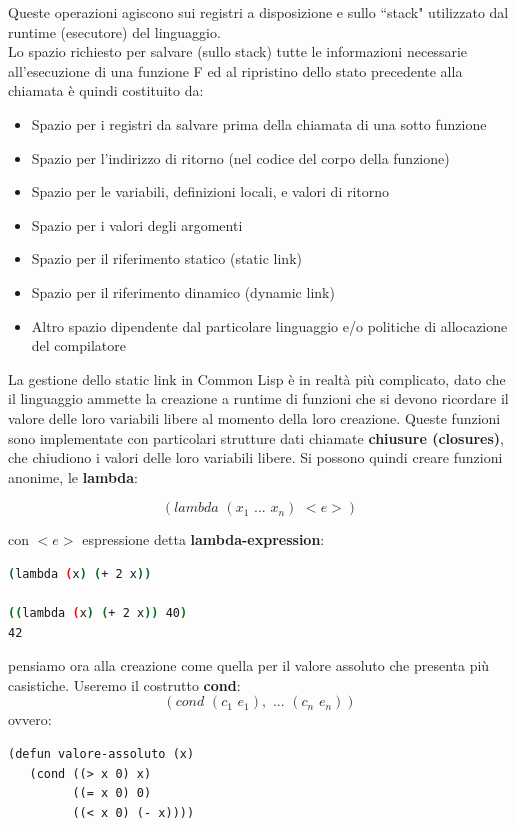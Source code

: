 \documentclass[a4paper,12pt, oneside]{book}
\begin{document}
Queste operazioni agiscono sui registri a disposizione e sullo “stack" utilizzato dal runtime (esecutore) del linguaggio.\\Lo spazio richiesto per salvare (sullo stack) tutte le informazioni necessarie all’esecuzione di
una funzione F ed al ripristino dello stato precedente alla chiamata è quindi costituito da:
\begin{itemize}
\item Spazio per i registri da salvare prima della chiamata di una sotto funzione
\item Spazio per l’indirizzo di ritorno (nel codice del corpo della funzione)
\item Spazio per le variabili, definizioni locali, e valori di ritorno
\item Spazio per i valori degli argomenti
\item Spazio per il riferimento statico (static link)
\item Spazio per il riferimento dinamico (dynamic link)
\item Altro spazio dipendente dal particolare linguaggio e/o politiche di allocazione del compilatore
\end{itemize}
La gestione dello static link in Common Lisp è in realtà più complicato,
dato che il linguaggio ammette la creazione a runtime di funzioni che si
devono ricordare il valore delle loro variabili libere al momento della
loro creazione. Queste funzioni sono implementate con particolari strutture dati chiamate \textbf{chiusure (closures)}, che chiudiono i valori delle loro variabili libere. Si possono quindi creare funzioni anonime, le \textbf{lambda}:
\begin{center}
$$(lambda\,\,(x_1\,\,...\,\,x_n)\,\,<e>)$$
\end{center}
con $<e>$ espressione detta \textbf{lambda-expression}:
\begin{shaded}
\begin{lstlisting}[language=bash]
(lambda (x) (+ 2 x))

((lambda (x) (+ 2 x)) 40)
42
\end{lstlisting}
\end{shaded}
pensiamo ora alla creazione come quella per il valore assoluto che presenta più casistiche. Useremo il costrutto \textbf{cond}:
$$(cond\,\,(c_1\,\,e_1),\,\,...\,\,(c_n\,\,e_n))$$
ovvero:
\begin{verbatim}
(defun valore-assoluto (x)
   (cond ((> x 0) x)
         ((= x 0) 0)
         ((< x 0) (- x))))
\end{verbatim}
\end{document}
